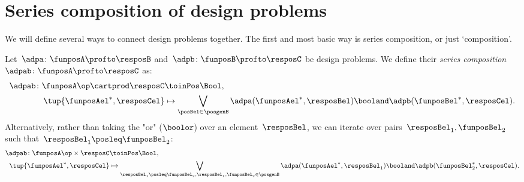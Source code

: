 
\section[Series composition]{Series composition of design problems}
We will define several ways to connect design problems together. The first and most basic way is series composition, or just `composition'.



\begin{definition}
    \label{def:dp-series}
    Let~$\adpa \colon  \funposA \profto \resposB$ and~$\adpb \colon \funposB \profto \resposC$ be design problems.
    We define their \emph{series composition}~$\adpab \colon  \funposA \profto \resposC$ as:
    \begin{equation}
        \label{eq:composition2}
        \begin{aligned}
            \adpab
            \colon \funposA\op \cartprod \resposC & \toinPos  \Bool, \\
            \tup{\funposAel^*, \resposCel} &\mapsto \bigvee_{\posBel \in \posgenB} \adpa(\funposAel^*,\resposBel) \booland \adpb(\funposBel^*,\resposCel).
        \end{aligned}
    \end{equation}
    Alternatively, rather than taking the "or" ($\boolor$) over an element~$\resposBel$, we
    can iterate over pairs~$\resposBel_1,\funposBel_2$ such that~$\resposBel_1\posleq\funposBel_2$:
    \begin{equation}
        \begin{aligned}
            \label{eq:composition}
            \adpab  \colon \funposA\op \times \resposC & \toinPos  \Bool,  \\
            \tup{\funposAel^*, \resposCel} &\mapsto \bigvee_{\resposBel_1\posleq\funposBel_2, \resposBel_1,\funposBel_2\in \posgenB} \adpa(\funposAel^*,\resposBel_1) \booland \adpb(\funposBel_2^*,\resposCel).
        \end{aligned}
    \end{equation}
\end{definition}


